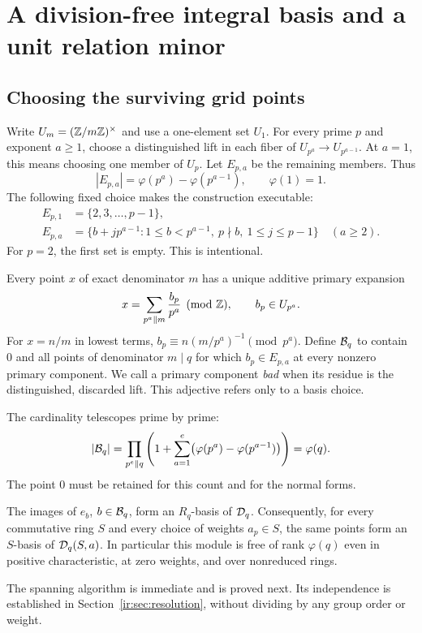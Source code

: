 \section{A division-free integral basis and a unit relation minor}
\label{ir:sec:integral}

\subsection{Choosing the surviving grid points}
Write $U_m=(\mathbb Z/m\mathbb Z)^\times$ and use a one-element set $U_1$.
For every prime $p$ and exponent $a\ge1$, choose a distinguished lift
in each fiber of $U_{p^a}\to U_{p^{a-1}}$. At $a=1$, this means choosing
one member of $U_p$. Let $E_{p,a}$ be the remaining members. Thus
\begin{equation}\label{ir:eq:local-count}
 |E_{p,a}|=\varphi(p^a)-\varphi(p^{a-1}),\qquad \varphi(1)=1.
\end{equation}
The following fixed choice makes the construction executable:
\begin{align}
 E_{p,1}&=\{2,3,\ldots,p-1\},\label{ir:eq:local-choice}\\
 E_{p,a}&=\{b+jp^{a-1}:1\le b<p^{a-1},\ p\nmid b,
                         \ 1\le j\le p-1\}\quad(a\ge2).\nonumber
\end{align}
For $p=2$, the first set is empty. This is intentional.

Every point $x$ of exact denominator $m$ has a unique additive primary
expansion
\begin{equation}\label{ir:eq:primary-coordinates}
 x=\sum_{p^a\parallel m}\frac{b_p}{p^a}\pmod{\mathbb Z},
 \qquad b_p\in U_{p^a}.
\end{equation}
For $x=n/m$ in lowest terms,
$b_p\equiv n(m/p^a)^{-1}\pmod{p^a}$. Define $\mathcal B_q$ to contain $0$
and all points of denominator $m\mid q$ for which
$b_p\in E_{p,a}$ at every nonzero primary component. We call a primary
component \emph{bad} when its residue is the distinguished, discarded
lift. This adjective refers only to a basis choice.

The cardinality telescopes prime by prime:
\begin{equation}\label{ir:eq:basis-count}
 |\mathcal B_q|=
 \prod_{p^e\parallel q}\left(1+
   \sum_{a=1}^{e}\bigl(\varphi(p^a)-\varphi(p^{a-1})\bigr)\right)
 =\varphi(q).
\end{equation}
The point $0$ must be retained for this count and for the normal forms.

\begin{theorem}\label{ir:thm:integral}
The images of $e_b$, $b\in\mathcal B_q$, form an $R_q$-basis of $\mathcal D_q$.
Consequently, for every commutative ring $S$ and every choice of weights
$a_p\in S$, the same points form an $S$-basis of $\mathcal D_q(S,a)$.
In particular this module is free of rank $\varphi(q)$ even in positive
characteristic, at zero weights, and over nonreduced rings.
\end{theorem}
The spanning algorithm is immediate and is proved next. Its independence
is established in Section~\ref{ir:sec:resolution}, without dividing by
any group order or weight.

